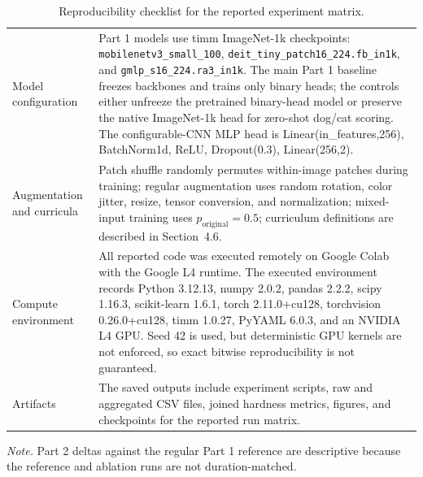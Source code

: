 \documentclass[12pt]{article}
\newcommand{\reporttablesize}{\small}
\newcommand{\reporttablenotesize}{\small}
\begin{document}
\begin{table}[!htbp]
{\begin{tabular}{p{}p{}}
    Model configuration & Part 1 models use timm ImageNet-1k checkpoints: \texttt{mobilenetv3\_small\_100}, \texttt{deit\_tiny\_patch16\_224.fb\_in1k}, and \texttt{gmlp\_s16\_224.ra3\_in1k}. The main Part 1 baseline freezes backbones and trains only binary heads; the controls either unfreeze the pretrained binary-head model or preserve the native ImageNet-1k head for zero-shot dog/cat scoring. The configurable-CNN MLP head is Linear(in\_features,256), BatchNorm1d, ReLU, Dropout(0.3), Linear(256,2). \\
    Augmentation and curricula & Patch shuffle randomly permutes within-image patches during training; regular augmentation uses random rotation, color jitter, resize, tensor conversion, and normalization; mixed-input training uses $p_{\mathrm{original}}=0.5$; curriculum definitions are described in Section~4.6. \\
    Compute environment & All reported code was executed remotely on Google Colab with the Google L4 runtime. The executed environment records Python 3.12.13, numpy 2.0.2, pandas 2.2.2, scipy 1.16.3, scikit-learn 1.6.1, torch 2.11.0+cu128, torchvision 0.26.0+cu128, timm 1.0.27, PyYAML 6.0.3, and an NVIDIA L4 GPU. Seed 42 is used, but deterministic GPU kernels are not enforced, so exact bitwise reproducibility is not guaranteed. \\
    Artifacts & The saved outputs include experiment scripts, raw and aggregated CSV files, joined hardness metrics, figures, and checkpoints for the reported run matrix. \\
    \bottomrule
  \end{tabular}
  }
  \caption{Reproducibility checklist for the reported experiment matrix.}
  \label{tab:reproducibility-checklist}
  \begin{flushleft}
  \reporttablenotesize\emph{Note.} Part 2 deltas against the regular Part 1 reference are descriptive because the reference and ablation runs are not duration-matched.
  \end{flushleft}
\end{table}

\begin{table}[!htbp]
  \centering
  \reporttablesize
  \caption{Architectural comparison of the three frozen feature extractors.}
  \label{tab:model-architecture-comparison}
\end{table}
\end{document}
